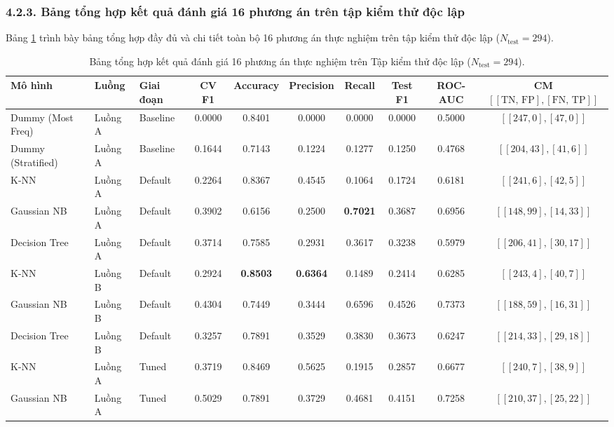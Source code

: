 \documentclass[12pt,a4paper]{article}
\begin{document}
\subsubsection{4.2.3. Bảng tổng hợp kết quả đánh giá 16 phương án trên tập kiểm thử độc lập}
Bảng \ref{tab:main_results} trình bày bảng tổng hợp đầy đủ và chi tiết toàn bộ 16 phương án thực nghiệm trên tập kiểm thử độc lập ($N_{\text{test}} = 294$).

\begin{table}[H]
\centering
\caption{Bảng tổng hợp kết quả đánh giá 16 phương án thực nghiệm trên Tập kiểm thử độc lập ($N_{\text{test}} = 294$).}
\label{tab:main_results}
\scriptsize
\begin{tabular}{|l|l|l|c|c|c|c|c|c|c|}
\hline
\textbf{Mô hình} & \textbf{Luồng} & \textbf{Giai đoạn} & \textbf{CV F1} & \textbf{Accuracy} & \textbf{Precision} & \textbf{Recall} & \textbf{Test F1} & \textbf{ROC-AUC} & \textbf{CM} $[[\text{TN, FP}], [\text{FN, TP}]]$ \\
\hline
Dummy (Most Freq) & Luồng A & Baseline & 0.0000 & 0.8401 & 0.0000 & 0.0000 & 0.0000 & 0.5000 & $[[247, 0], [47, 0]]$ \\
\hline
Dummy (Stratified) & Luồng A & Baseline & 0.1644 & 0.7143 & 0.1224 & 0.1277 & 0.1250 & 0.4768 & $[[204, 43], [41, 6]]$ \\
\hline
K-NN & Luồng A & Default & 0.2264 & 0.8367 & 0.4545 & 0.1064 & 0.1724 & 0.6181 & $[[241, 6], [42, 5]]$ \\
\hline
Gaussian NB & Luồng A & Default & 0.3902 & 0.6156 & 0.2500 & \textbf{0.7021} & 0.3687 & 0.6956 & $[[148, 99], [14, 33]]$ \\
\hline
Decision Tree & Luồng A & Default & 0.3714 & 0.7585 & 0.2931 & 0.3617 & 0.3238 & 0.5979 & $[[206, 41], [30, 17]]$ \\
\hline
K-NN & Luồng B & Default & 0.2924 & \textbf{0.8503} & \textbf{0.6364} & 0.1489 & 0.2414 & 0.6285 & $[[243, 4], [40, 7]]$ \\
\hline
Gaussian NB & Luồng B & Default & 0.4304 & 0.7449 & 0.3444 & 0.6596 & 0.4526 & 0.7373 & $[[188, 59], [16, 31]]$ \\
\hline
Decision Tree & Luồng B & Default & 0.3257 & 0.7891 & 0.3529 & 0.3830 & 0.3673 & 0.6247 & $[[214, 33], [29, 18]]$ \\
\hline
K-NN & Luồng A & Tuned & 0.3719 & 0.8469 & 0.5625 & 0.1915 & 0.2857 & 0.6677 & $[[240, 7], [38, 9]]$ \\
\hline
Gaussian NB & Luồng A & Tuned & 0.5029 & 0.7891 & 0.3729 & 0.4681 & 0.4151 & 0.7258 & $[[210, 37], [25, 22]]$ \\

\end{tabular}
\end{table}
\end{document}
